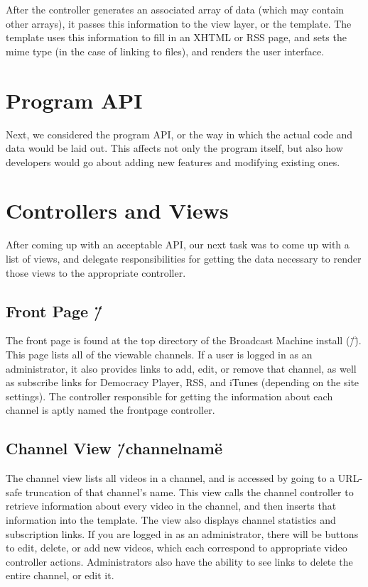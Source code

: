 \documentclass[a4paper,12pt]{report}
\begin{document}
After the controller generates an associated array of data (which may contain other arrays), it passes this information to the view layer, or the template.
The template uses this information to fill in an XHTML or RSS page, and sets the mime type (in the case of linking to files), and renders the user interface.


\section{Program API}
Next, we considered the program API, or the way in which the actual code and data would be laid out.
This affects not only the program itself, but also how developers would go about adding new features and modifying existing ones.


\section{Controllers and Views}
After coming up with an acceptable API, our next task was to come up with a list of views, and delegate responsibilities for getting the data necessary to render those views to the appropriate controller.


\subsection{Front Page \"/\"}
The front page is found at the top directory of the Broadcast Machine install (\"/\").
This page lists all of the viewable channels.
If a user is logged in as an administrator, it also provides links to add, edit, or remove that channel, as well as subscribe links for Democracy Player, RSS, and iTunes (depending on the site settings).
The controller responsible for getting the information about each channel is aptly named the frontpage controller.


\subsection{Channel View \"/channelname\"}
The channel view lists all videos in a channel, and is accessed by going to a URL-safe truncation of that channel's name.
This view calls the channel controller to retrieve information about every video in the channel, and then inserts that information into the template.
The view also displays channel statistics and subscription links.
If you are logged in as an administrator, there will be buttons to edit, delete, or add new videos, which each correspond to appropriate video controller actions.
Administrators also have the ability to see links to delete the entire channel, or edit it.
\end{document}
